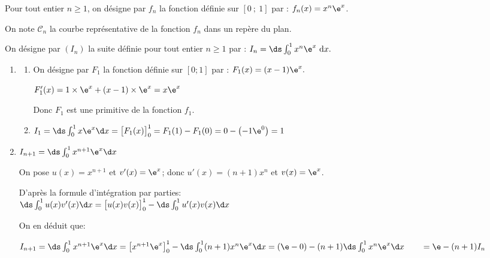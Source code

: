 


\medskip


\medskip

Pour tout entier $n\geqslant 1$, on désigne par $f_{n}$ la fonction définie sur $[0~;~1]$ par :
$f_{n}(x) = x^{n} \e^{x}$.

On note $\mathcal{C}_{n}$ la courbe représentative de la fonction $f_{n}$ dans un repère \Oij{} du plan.

On désigne par $\left(I_{n}\right)$ la suite définie pour tout entier $n\geqslant 1$ par :
$I_{n} =\ds \int_{0}^{1} x^{n} \e^{x} \mathrm{~d} x.$

\begin{enumerate}
\item 
	\begin{enumerate}
		\item On désigne par $F_{1}$ la fonction définie sur $[0 ; 1]$ par : $F_{1}(x) = (x-1) \e^{x}.$

$F'_1(x)=1\times \e^{x} + (x-1)\times \e^{x} = x\e^{x}$

Donc $F_{1}$ est une primitive de la fonction $f_{1}$.

		\item $I_{1} = \ds \int_{0}^{1} x \e^{x} \d x = \left [ F_1(x)\strut\right ]_{0}^{1}= F_1(1)-F_1(0) = 0- \left (-1\e^{0}\right )=1$
		
	\end{enumerate}
	
\item %
$I_{n+1}=\ds\int_{0}^{1} x^{n+1}\e^{x}\d x$

On pose $u(x)=x^{n+1}$ et $v'(x)=\e^{x}$; donc $u'(x)=(n+1)x^n$ et $v(x)=\e^{x}$.

D'après la formule d'intégration par parties:\\
$\ds\int_{0}^{1} u(x)v'(x) \d x =  \left [ u(x)v(x)\strut \right ]_{0}^{1} - \ds\int_{0}^{1} u'(x)v(x)\d x$

On en déduit que:

$I_{n+1}=\ds\int_{0}^{1} x^{n+1}\e^{x} \d x =  \left [ x^{n+1}\e^{x}\strut \right ]_{0}^{1} - \ds\int_{0}^{1} (n+1)x^n \e^{x}\d x
= (\e - 0) - (n+1) \ds\int_{0}^{1} x^n \e^{x} \d x\\
\phantom{I_{n+1}}
= \e -(n+1) I_{n}$


\end{enumerate}
